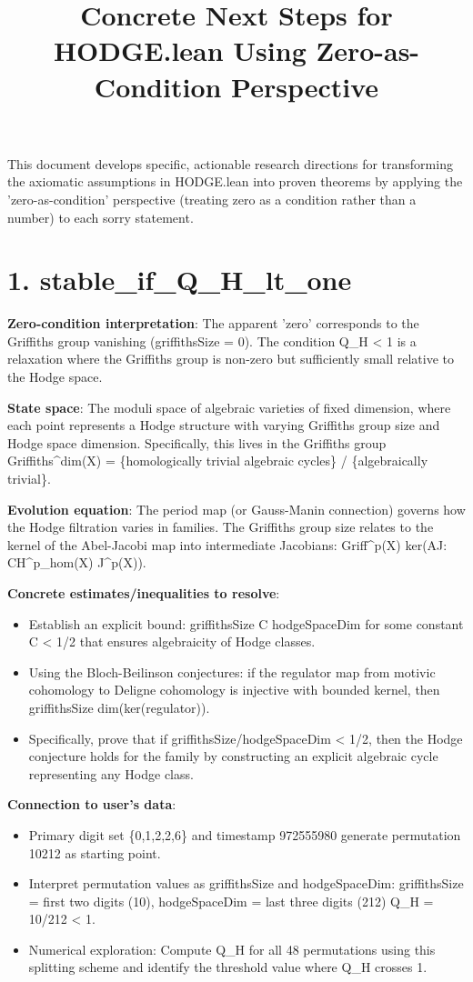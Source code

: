 \documentclass[11pt]{article}
\title{Concrete Next Steps for HODGE.lean Using Zero-as-Condition Perspective}
\author{}
\date{}
\begin{document}
\maketitle
This document develops specific, actionable research directions for transforming the axiomatic assumptions in HODGE.lean into proven theorems by applying the 'zero-as-condition' perspective (treating zero as a condition rather than a number) to each sorry statement.

\section{1. stable\_if\_Q\_H\_lt\_one}

\textbf{Zero-condition interpretation}: The apparent 'zero' corresponds to the Griffiths group vanishing (griffithsSize = 0). The condition Q\_H < 1 is a relaxation where the Griffiths group is non-zero but sufficiently small relative to the Hodge space.

\textbf{State space}: The moduli space of algebraic varieties of fixed dimension, where each point represents a Hodge structure with varying Griffiths group size and Hodge space dimension. Specifically, this lives in the Griffiths group Griffiths^{dim}(X) = \{homologically trivial algebraic cycles\} / \{algebraically trivial\}.

\textbf{Evolution equation}: The period map (or Gauss-Manin connection) governs how the Hodge filtration varies in families. The Griffiths group size relates to the kernel of the Abel-Jacobi map into intermediate Jacobians: Griff^{p}(X) \cong ker(AJ: CH^{p}_{hom}(X) \rightarrow J^{p}(X)).

\textbf{Concrete estimates/inequalities to resolve}:
\begin{itemize}
\item Establish an explicit bound: griffithsSize \leq C \cdot hodgeSpaceDim for some constant C < 1/2 that ensures algebraicity of Hodge classes.
\item Using the Bloch-Beilinson conjectures: if the regulator map from motivic cohomology to Deligne cohomology is injective with bounded kernel, then griffithsSize \leq dim(ker(regulator)).
\item Specifically, prove that if griffithsSize/hodgeSpaceDim < 1/2, then the Hodge conjecture holds for the family by constructing an explicit algebraic cycle representing any Hodge class.
\end{itemize}

\textbf{Connection to user's data}:
\begin{itemize}
\item Primary digit set \{0,1,2,2,6\} and timestamp 972555980 generate permutation 10212 as starting point.
\item Interpret permutation values as griffithsSize and hodgeSpaceDim: griffithsSize = first two digits (10), hodgeSpaceDim = last three digits (212) \rightarrow Q\_H = 10/212  < 1.
\item Numerical exploration: Compute Q\_H for all 48 permutations using this splitting scheme and identify the threshold value where Q\_H crosses 1.
\end{itemize}
\end{document}
